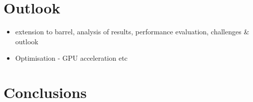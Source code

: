 \section{Outlook}
\begin{itemize}
    \item extension to barrel, analysis of results, performance  evaluation, challenges & outlook
    \item Optimisation - GPU acceleration etc
\end{itemize}


\section{Conclusions}